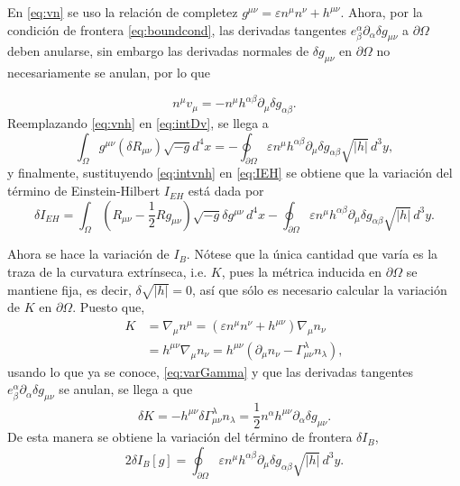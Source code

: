 %
En \eqref{eq:vn} se uso la relación de completez $g^{\mu \nu} = \varepsilon n^{\mu} n^{\nu} + h^{\mu \nu}$. Ahora, por la condición de frontera \eqref{eq:boundcond}, las derivadas tangentes $e^{\alpha}_{\beta} \partial_{\alpha} \delta g_{\mu \nu}$ a $\partial \Omega$ deben anularse, sin embargo las derivadas normales de $\delta g_{\mu \nu}$ en $\partial \Omega$ no necesariamente se anulan, por lo que

\begin{equation}
\label{eq:vnh}
n^{\mu} v_{\mu} = - n^{\mu} h^{\alpha \beta} \partial_{\mu} \delta g_{\alpha \beta}.
\end{equation}
%
Reemplazando \eqref{eq:vnh} en \eqref{eq:intDv}, se llega a
%
\begin{equation}
\label{eq:intvnh}
\int_{\Omega} g^{\mu \nu} (\delta R_{\mu \nu}) \sqrt{-g} d^4 x = - \oint_{\partial \Omega} \varepsilon n^{\mu} h^{\alpha \beta} \partial_{\mu} \delta g_{\alpha \beta} \sqrt{|h|} \, d^{3} y,
\end{equation}
%
y finalmente, sustituyendo \eqref{eq:intvnh} en \eqref{eq:IEH} se obtiene que la variación del término de Einstein-Hilbert $I_{EH}$ está dada por
%
\begin{equation}
\label{eq:varIEH}
\delta I_{EH} = \int_{\Omega} \left(R_{\mu \nu} - \frac{1}{2} R g_{\mu \nu} \right) \sqrt{-g} \delta g^{\mu \nu} \, d^{4} x - \oint_{\partial \Omega} \varepsilon n^{\mu} h^{\alpha \beta} \partial_{\mu} \delta g_{\alpha \beta} \sqrt{|h|} \, d^{3} y.
\end{equation}

Ahora se hace la variación de $I_{B}$. Nótese que la única cantidad que varía es la traza de la curvatura extrínseca, i.e. $K$, pues la métrica inducida en $\partial \Omega$ se mantiene fija, es decir, $\delta \sqrt{|h|} = 0$, así que sólo es necesario calcular la variación de $K$ en $\partial \Omega$. Puesto que,
%
\begin{align}
\label{eq:definitionK}
K & = \nabla_{\mu} n^{\mu} = (\varepsilon n^{\mu} n^{\nu} + h^{\mu \nu}) \nabla_{\mu} n_{\nu} \nonumber \\
& = h^{\mu \nu} \nabla_{\mu} n_{\nu} = h^{\mu \nu} (\partial_{\mu} n_{\nu} - \Gamma^{\lambda}_{\mu \nu} n_{\lambda}),
\end{align}
%
usando lo que ya se conoce, \eqref{eq:varGamma} y que las derivadas tangentes $e^{\alpha}_{\beta} \partial_{\alpha} \delta g_{\mu \nu}$ se anulan, se llega a que
%
\begin{equation}
\label{eq:varK}
\delta K = -h^{\mu \nu} \delta \Gamma^{\lambda}_{\mu \nu} n_{\lambda} = \frac{1}{2} n^{\alpha} h^{\mu \nu} \partial_{\alpha} \delta g_{\mu \nu}.
\end{equation}
%
De esta manera se obtiene la variación del término de frontera $\delta I_{B}$,
%
\begin{equation}
\label{eq:varIB}
2 \delta I_{B} [g] = \oint_{\partial \Omega} \varepsilon n^{\mu} h^{\alpha \beta} \partial_{\mu} \delta g_{\alpha \beta} \sqrt{|h|} \, d^{3} y.
\end{equation}

